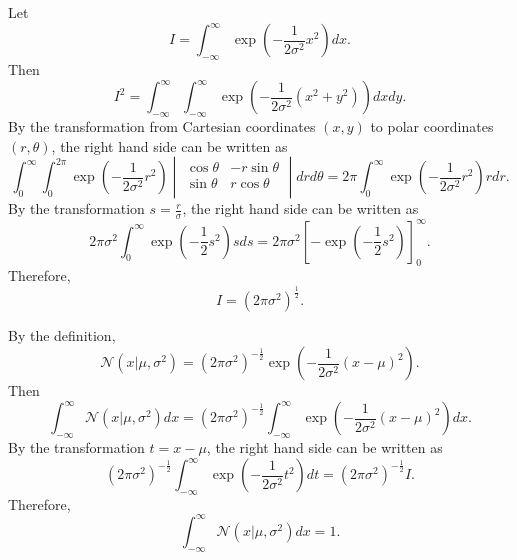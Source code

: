 \subsection{}
\label{1.7}
Let
%
\begin{equation}
I 
= 
\int_{-\infty}^{\infty} 
\exp 
\left( 
	-
	\frac{1}{2 \sigma ^ 2} 
	x ^ 2 
\right) 
dx.
\end{equation}
%
Then
%
\begin{equation}
I ^ 2 
= 
\int_{-\infty}^{\infty} 
\int_{-\infty}^{\infty} 
\exp 
\left( 
	-
	\frac{1}{2 \sigma ^ 2} 
	\left( 
		x ^ 2 
		+ 
		y ^ 2 
	\right) 
\right) 
dx 
dy.
\end{equation}
%
By the transformation from Cartesian coordinates $(x, y)$ to polar coordinates $(r, \theta)$, the right hand side can be written as
%
\begin{equation}
\int_{0}^{\infty} 
\int_{0}^{2 \pi} 
\exp 
\left( 
	- 
	\frac{1}{2 \sigma ^ 2} 
	r ^ 2 
\right) 
\begin{vmatrix}
\cos \theta & - r \sin \theta \\
\sin \theta &  r \cos \theta \\
\end{vmatrix}
dr 
d\theta
= 
2 \pi 
\int_{0}^{\infty} 
\exp 
\left( 
	- 
	\frac{1}{2 \sigma ^ 2} 
	r ^ 2 
\right) 
r 
dr.
\end{equation}
%
By the transformation $s = \frac{r}{\sigma}$, the right hand side can be written as
%
\begin{equation}
2 \pi \sigma ^ 2 
\int_{0}^{\infty} 
\exp 
\left( 
	- 
	\frac{1}{2} 
	s ^ 2 
\right)
s 
ds 
= 
2 \pi \sigma ^ 2 
\left[ 
	- 
	\exp 
	\left( 
		- 
		\frac{1}{2} 
		s ^ 2 
	\right) 
\right]_{0}^{\infty}.
\end{equation}
%
Therefore, 
%
\begin{equation}
I 
= 
\left( 
	2 \pi \sigma ^ 2 
\right) ^ \frac{1}{2}. 
\end{equation}
%

By the definition,
%
\begin{equation}
\mathcal{N} 
\left( 
	x 
	| 
	\mu, 
	\sigma ^ 2 
\right) 
= 
\left( 
	2 \pi \sigma ^ 2 
\right) ^ {- \frac{1}{2}} 
\exp 
\left( 
	- 
	\frac{1}{2 \sigma ^ 2} 
	(x - \mu) ^ 2 
\right).
\end{equation}
%
Then
%
\begin{equation}
\int_{- \infty}^{\infty} 
\mathcal{N} 
\left( 
	x 
	| 
	\mu, 
	\sigma ^ 2 
\right) 
dx 
= 
\left( 
	2 \pi \sigma ^ 2 
\right) ^ {- \frac{1}{2}} 
\int_{-\infty}^{\infty} 
\exp 
\left( 
	-
	\frac{1}{2 \sigma ^ 2} 
	(x - \mu) ^ 2 
\right) 
dx.
\end{equation}
%
By the transformation $t = x - \mu$, the right hand side can be written as 
%
\begin{equation}
\left( 
	2 \pi \sigma ^ 2 
\right) ^ {- \frac{1}{2}} 
\int_{-\infty}^{\infty} 
\exp 
\left( 
	-
	\frac{1}{2 \sigma ^ 2} 
	t ^ 2 
\right) dt 
= 
\left( 
	2 \pi \sigma ^ 2 
\right) ^ {- \frac{1}{2}} 
I.
\end{equation}
%
Therefore,
%
\begin{equation}
\int_{- \infty}^{\infty} 
\mathcal{N} 
\left( 
	x 
	| 
	\mu, 
	\sigma ^ 2 
\right) 
dx 
= 
1.
\end{equation}
%


